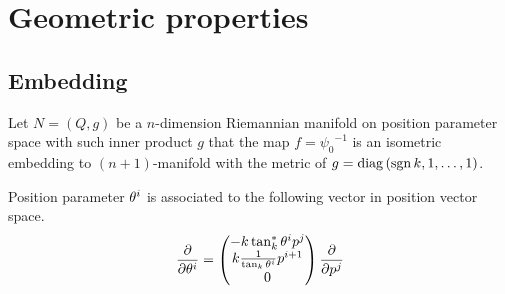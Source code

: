 \documentclass[../main.tex]{subfiles}
\begin{document}
\section{Geometric properties}
\subsection{Embedding}
\begin{definition}\label{M:Embedding}
    Let $N=\left(Q,g\right)$ be a $n$-dimension Riemannian manifold
    on position parameter space with such inner product $g$ that
    the map $f={\psi_0}^{-1}$
    is an isometric embedding to $\left(n+1\right)$-manifold
    with the metric of $g=\operatorname{diag}{\left(\operatorname{sgn}{k},1,\dots,1\right)}$.
\end{definition}
\begin{lemma}\label{M:Tangent:Basis}
    Position parameter $\tensor{\theta}{^i}$ is associated to the following vector in position vector space.
    \begin{equation*}
        \frac{\partial}{\partial\tensor{\theta}{^i}} =
        \begin{pmatrix}
            -k\tan_k^\ast\tensor{\theta}{^i}\tensor{p}{^j}         \\
            k\frac{1}{\tan_k\tensor{\theta}{^i}}\tensor{p}{^{i+1}} \\
            0
        \end{pmatrix} \frac{\partial}{\partial\tensor{p}{^j}}
    \end{equation*}
\end{lemma}
\end{document}
